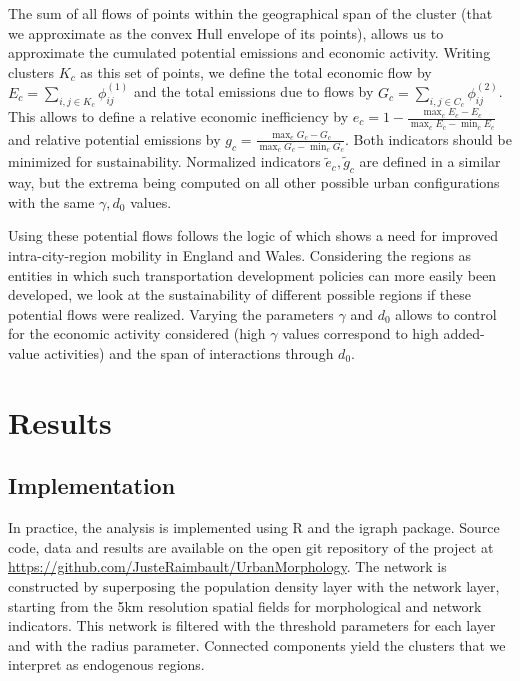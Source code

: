 \documentclass{jimis-en}
\begin{document}
The sum of all flows of points within the geographical span of the cluster (that we approximate as the convex Hull envelope of its points), allows us to approximate the cumulated potential emissions and economic activity. Writing clusters $K_c$ as this set of points, we define the total economic flow by $E_c = \sum_{i,j \in K_c} \phi_{ij}^{(1)}$ and the total emissions due to flows by $G_c = \sum_{i,j \in C_c} \phi_{ij}^{(2)}$. This allows to define a relative economic inefficiency by $e_c = 1 - \frac{\max_c E_c - E_c}{\max_c E_c - \min_c E_c}$ and relative potential emissions by $g_c = \frac{\max_c G_c - G_c}{\max_c G_c - \min_c G_c}$. Both indicators should be minimized for sustainability. Normalized indicators $\tilde{e}_c,\tilde{g}_c$ are defined in a similar way, but the extrema being computed on all other possible urban configurations with the same $\gamma,d_0$ values.

Using these potential flows follows the logic of \cite{arbabi2019development} which shows a need for improved intra-city-region mobility in England and Wales. Considering the regions as entities in which such transportation development policies can more easily been developed, we look at the sustainability of different possible regions if these potential flows were realized. Varying the parameters $\gamma$ and $d_0$ allows to control for the economic activity considered (high $\gamma$ values correspond to high added-value activities) and the span of interactions through $d_0$.



\section{Results}

\subsection{Implementation}


In practice, the analysis is implemented using R and the igraph package. Source code, data and results are available on the open git repository of the project at \url{https://github.com/JusteRaimbault/UrbanMorphology}. The network is constructed by superposing the population density layer with the network layer, starting from the 5km resolution spatial fields for morphological and network indicators. This network is filtered with the threshold parameters for each layer and with the radius parameter. Connected components yield the clusters that we interpret as endogenous regions.
\end{document}
